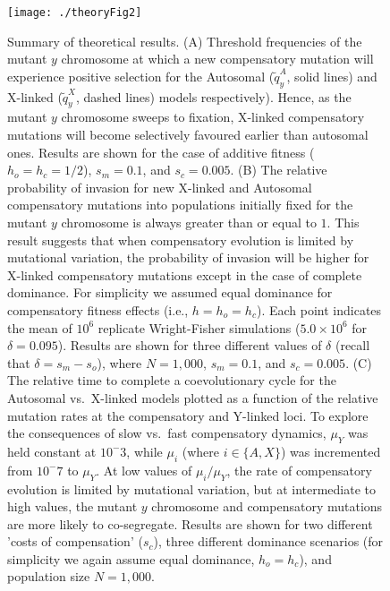 \documentclass{article}
\begin{document}
\newpage
\begin{figure}[htbp]
\centering
\texttt{[image: ./theoryFig2]}
\caption{Summary of theoretical results. (A) Threshold frequencies of the mutant $y$ chromosome at which a new compensatory mutation will experience positive selection for the Autosomal ($\tilde{q}_y^A$, solid lines) and X-linked ($\tilde{q}_y^X$, dashed lines) models respectively). Hence, as the mutant $y$ chromosome sweeps to fixation, X-linked compensatory mutations will become selectively favoured earlier than autosomal ones. Results are shown for the case of additive fitness ($h_o = h_c = 1/2$), $s_m = 0.1$, and $s_c = 0.005$. (B) The relative probability of invasion for new X-linked and Autosomal compensatory mutations into populations initially fixed for the mutant $y$ chromosome is always greater than or equal to $1$. This result suggests that when compensatory evolution is limited by mutational variation, the probability of invasion will be higher for X-linked compensatory mutations except in the case of complete dominance. For simplicity we assumed equal dominance for compensatory fitness effects (i.e., $h = h_o = h_c$). Each point indicates the mean of $10^6$ replicate Wright-Fisher simulations ($5.0 \times 10^6$ for $\delta = 0.095$). Results are shown for three different values of $\delta$ (recall that $\delta = s_m - s_o$), where $N = 1,000$, $s_m = 0.1$, and $s_c = 0.005$. (C) The relative time to complete a coevolutionary cycle for the Autosomal vs.~X-linked models plotted as a function of the relative mutation rates at the compensatory and Y-linked loci. To explore the consequences of slow vs.~fast compensatory dynamics, $\mu_Y$ was held constant at $10^-3$, while $\mu_i$ (where $i \in \{A,X\}$) was incremented from $10^-7$ to $\mu_Y$. At low values of $\mu_i/\mu_Y$, the rate of compensatory evolution is limited by mutational variation, but at intermediate to high values, the mutant $y$ chromosome and compensatory mutations are more likely to co-segregate. Results are shown for two different 'costs of compensation' ($s_c$), three different dominance scenarios (for simplicity we again assume equal dominance, $h_o = h_c$), and population size $N = 1,000$.}
\label{fig:theoryFig}
\end{figure}

\end{document}
